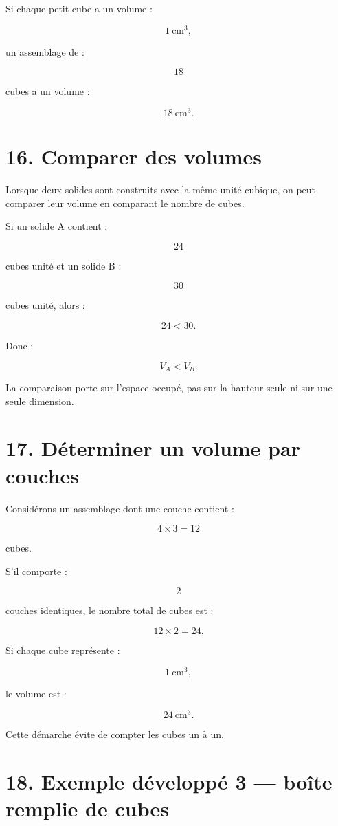 Si chaque petit cube a un volume :

\[
1\ \text{cm}^3,
\]

un assemblage de :

\[
18
\]

cubes a un volume :

\[
18\ \text{cm}^3.
\]

\section{16. Comparer des volumes}

Lorsque deux solides sont construits avec la même unité cubique, on peut comparer leur volume en comparant le nombre de cubes.

Si un solide A contient :

\[
24
\]

cubes unité et un solide B :

\[
30
\]

cubes unité, alors :

\[
24<30.
\]

Donc :

\[
V_A<V_B.
\]

La comparaison porte sur l’espace occupé, pas sur la hauteur seule ni sur une seule dimension.

\section{17. Déterminer un volume par couches}

Considérons un assemblage dont une couche contient :

\[
4\times3=12
\]

cubes.

S’il comporte :

\[
2
\]

couches identiques, le nombre total de cubes est :

\[
12\times2=24.
\]

Si chaque cube représente :

\[
1\ \text{cm}^3,
\]

le volume est :

\[
\boxed{24\ \text{cm}^3}.
\]

Cette démarche évite de compter les cubes un à un.

\section{18. Exemple développé 3 — boîte remplie de cubes}

